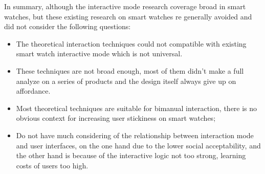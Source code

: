 In summary, although the interactive mode research coverage broad in smart watches, but these existing research on smart watches re generally avoided and did not consider the following questions:
\begin{itemize}
    \kaishu
    \item The theoretical interaction techniques could not compatible with existing smart watch interactive mode which is not universal.
    \item These techniques are not broad enough, most of them didn't make a full analyze on a series of products and the design itself always give up on affordance.
    \item Most theoretical techniques are suitable for bimanual interaction, there is no obvious context for increasing user stickiness on smart watches;
    \item Do not have much considering of the relationship between interaction mode and user interfaces, on the one hand due to the lower social acceptability, and the other hand is because of the interactive logic not too strong, learning costs of users too high.
\end{itemize}

\cleardoublepage
